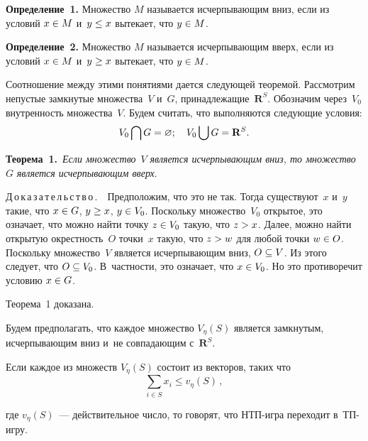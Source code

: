 \begin{multicols}{2}
    \noindent
\textbf{Определение~1.} Множество $M$ называется исчерпывающим вниз, 
если из условий $x\hm\in M$ и~$y\hm\leq x$ вытекает, что $y\hm\in M$. 

     \smallskip
     
    \noindent
\textbf{Определение~2.} Множество $M$ называется исчерпывающим вверх, 
если из условий $x\hm\in M$ и~$y\hm \geq x$ вытекает, что $y\hm\in M$. 

\smallskip
    
Соотношение между этими понятиями дается следующей теоремой. 
Рассмотрим непустые замк\-ну\-тые множества~$V$ и~$G$, 
принадлежащие~$\mathbf{R}^S$. Обозначим через~$V_0$ внутренность 
множества~$V$. Будем считать, что выполняются следующие условия: 
$$
V_0\bigcap G\hm= \varnothing;\quad V_0\bigcup G\hm= \mathbf{R}^S.
$$
    
     
    \noindent
\textbf{Теорема~1.}\ \textit{Если множество}~$V$ \textit{является ис\-чер\-пы\-ва\-ющим 
вниз, то множество}~$G$ \textit{является ис\-чер\-пы\-ва\-ющим вверх}.
    

\smallskip

\noindent
Д\,о\,к\,а\,з\,а\,т\,е\,л\,ь\,с\,т\,в\,о\,.\ \  Предположим, что это не так. Тогда 
существуют~$x$ и~$y$ такие, что $x\hm\in G$, $y\hm\geq x$, $y\hm\in V_0$. 
Поскольку множество~$V_0$ открытое, это означает, что можно найти точку 
$z\hm\in V_0$ такую, что $z\hm> x$. Далее, можно найти открытую 
окрестность~$O$ точки~$x$ такую, что $z\hm>w$ для любой точки $w\hm \in 
O$. Поскольку множество~$V$ является исчерпывающим вниз, $O\hm\subseteq 
V$. Из этого следует, что $O\hm\subseteq V_0$. В~частности, это означает, что 
$x\hm\in V_0$. Но это противоречит условию $x\hm\in G$.

Теорема~1 доказана.

\smallskip

Будем предполагать, что каждое множество $V_{\eta}(S)$ является замкнутым, 
исчерпывающим вниз и~не совпадающим с~$\mathbf{R}^S$.
    
Если каждое из множеств $V_\eta(S)$ состоит из векторов, таких что 
$$
\sum\limits_{i\in S} x_i\leq v_\eta(S)\,,
$$

\vspace*{-2pt}

\noindent
где $v_\eta(S)$~--- действительное число, то говорят, что НТП-иг\-ра 
переходит в~ТП-игру.

\vspace*{-7pt}


\end{multicols}
